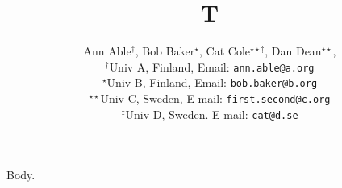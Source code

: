 \documentclass{IEEEtran}
\begin{document}
\title{T}
\author{Ann Able$^{\dag}$, Bob Baker$^{\star}$, Cat Cole$^{\star \star \ddag}$, Dan Dean$^{\star \star}$, \\
\small $^\dag$Univ A, Finland, Email: \texttt{ann.able@a.org}\\
\small $^{\star}$Univ B, Finland, Email: \texttt{bob.baker@b.org}\\
\small $^{\star \star}$Univ C, Sweden, E-mail: \texttt{first.second@c.org}\\
\small $^\ddag$Univ D, Sweden. E-mail: \texttt{cat@d.se}\\
}
\maketitle
Body.
\end{document}
